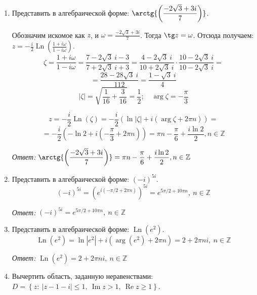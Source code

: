\documentclass[14pt, a4paper, titlepage, fleqn]{extarticle}
\newcommand{\otv}{\textit{Ответ:} }
\DeclareMathOperator{\Ln}{Ln}
\DeclareMathOperator{\Imz}{Im}
\DeclareMathOperator{\Rez}{Re}
\begin{document}
\begin{enumerate}
        \otv \( \sh{\left( 1 + 4 \pi i \right)} = \sh 1 \)
        
        \item Представить в алгебраической форме: \( \displaystyle \arctg{\left( \frac{-2\sqrt{3} + 3i}{7} \right)} \).
        
        Обозначим искомое как \( z \), и \( \displaystyle \omega = \frac{-2\sqrt{3} + 3i}{7} \). 
        Тогда \( \tg z = \omega \). Отсюда получаем:
        \( 
            \displaystyle
            z = - \frac{i}{2} \Ln \left( \frac{1 + i \omega}{1 - i \omega} \right)
        \).
        \[
            \zeta = \frac{1 + i \omega}{1 - i \omega} = \frac{7 - 2\sqrt{3} ~ i - 3}{7 + 2\sqrt{3} ~ i + 3} =
            \frac{4 - 2\sqrt{3} ~ i}{10 + 2\sqrt{3} ~ i} \cdot \frac{10 - 2\sqrt{3} ~ i}{10 - 2\sqrt{3} ~ i} =
        \]
        \[
            = \frac{28 - 28 \sqrt{3} ~ i}{112}= \frac{1 - \sqrt{3} ~ i}{4}
        \]
        \[
            |\zeta| = \sqrt{ \frac{1}{16} + \frac{3}{16} } = \frac{1}{2}; \quad
            \arg{\zeta} = -\frac{\pi}{3}
        \]

        \[
            z = -\frac{i}{2} \Ln \left( \zeta \right) = -\frac{i}{2} \left( \ln |\zeta| + i (\arg \zeta + 2 \pi n) \right) =
        \]
        \[
            = -\frac{i}{2} \left( -\ln 2 + i \left( -\frac{\pi}{3} + 2 \pi n \right) \right) = \pi n - \frac{\pi}{6} + \frac{i \ln 2}{2}, n \in \mathbb{Z}
        \]

        \otv \( \displaystyle \arctg{\left( \frac{-2\sqrt{3} + 3i}{7} \right)} = \pi n - \frac{\pi}{6} + \frac{i \ln 2}{2}, n \in \mathbb{Z} \)

        \pagebreak

        \item Представить в алгебраической форме: \( (-i)^{5i} \).
        \[
            (-i)^{5i} = \left( e^{i(-\pi/2 + 2 \pi n)} \right)^{5i} = e^{5\pi/2 + 10\pi n}, ~ n \in \mathbb{Z}
        \]

        \otv \( (-i)^{5i} = e^{5\pi/2 + 10\pi n}, ~ n \in \mathbb{Z} \)

        \item Представить в алгебраической форме: \( \Ln\left( e^2 \right) \).
        \[
            \Ln\left( e^2 \right) = \ln \left\vert e^2 \right\vert + i \left(\arg \left(e^2\right) + 2 \pi n\right) = 2 + 2 \pi n i, ~ n \in \mathbb{Z}
        \]

        \otv \( \Ln\left( e^2 \right) = 2 + 2 \pi n i, ~ n \in \mathbb{Z} \)

        \item Вычертить область, заданную неравенствами: \\
        \( D = \left\lbrace z: ~ |z - 1 - i| \leq 1, ~ \Imz z > 1, ~ \Rez z \geq 1 \right\rbrace \).


\end{enumerate}
\end{document}

